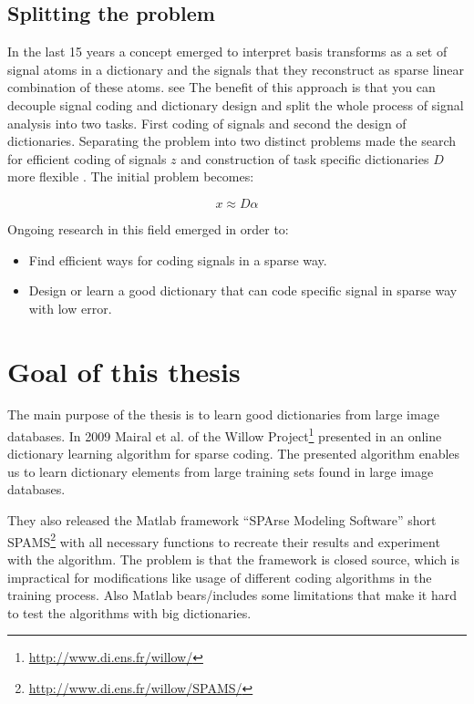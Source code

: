 \subsection{Splitting the problem}
\cite{Rubinstein2010}
In the last 15 years a concept emerged to interpret basis transforms as a set of
signal atoms in a dictionary and the signals that they reconstruct as sparse
linear combination of these atoms. see\cite{Olshausen1996,Mallat1993} The
benefit of this approach is that you can decouple signal coding and dictionary
design and split the whole process of signal analysis into two tasks. First
coding of signals and second the design of dictionaries. Separating the problem
into two distinct problems made the search for efficient coding of signals $z$
and construction of task specific dictionaries $D$ more flexible \cite{?}. The
initial problem becomes:

\begin{equation}
 x \approx D\alpha
\end{equation}


Ongoing research in this field emerged in order to:
\begin{itemize}
 \item Find efficient ways for coding signals in a sparse way.
 \item Design or learn a good dictionary that can code specific signal in sparse
way with low error.
\end{itemize}


\section{Goal of this thesis}
The main purpose of the thesis is to learn good dictionaries from large
image databases. %
In 2009 Mairal et al. of the Willow
Project\footnote{\url{http://www.di.ens.fr/willow/}} presented in
\cite{Mairal2009,Mairal2010} an online dictionary learning algorithm for sparse
coding. The presented algorithm enables us to learn dictionary elements from
large training sets found in large image databases.

They also released the Matlab framework ``SPArse Modeling Software''
short SPAMS\footnote{\url{http://www.di.ens.fr/willow/SPAMS/}} with all
necessary functions to recreate their results and experiment with the algorithm.
The problem is that the framework is closed source, which is impractical for
modifications like usage of different coding algorithms in the training process.
Also Matlab bears/includes some limitations that make it hard to test the
algorithms with big dictionaries.


